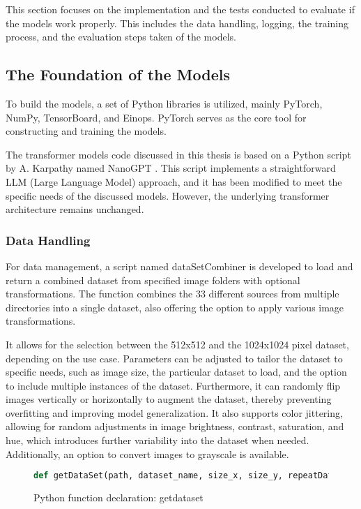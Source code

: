 
    This section focuses on the implementation and the tests conducted to evaluate if the models work properly. This includes the data handling, logging, the training process, and the evaluation steps taken of the models. 


    \subsection{The Foundation of the Models}

    To build the models, a set of Python libraries is utilized, mainly PyTorch, NumPy, TensorBoard, and Einops. PyTorch serves as the core tool for constructing and training the models.
    
    The transformer models code discussed in this thesis is based on a Python script by A. Karpathy named NanoGPT \autocite{nanoGPTkarpathy2023}. This script implements a straightforward LLM (Large Language Model) approach, and it has been modified to meet the specific needs of the discussed models. However, the underlying transformer architecture remains unchanged.
    
    \subsubsection{Data Handling}
    \label{sec:DataHandling}

    For data management, a script named dataSetCombiner is developed to load and return a combined dataset from specified image folders with optional transformations. The function combines the 33 different sources from multiple directories into a single dataset, also offering the option to apply various image transformations.
    
    It allows for the selection between the 512x512 and the 1024x1024 pixel dataset, depending on the use case. Parameters can be adjusted to tailor the dataset to specific needs, such as image size, the particular dataset to load, and the option to include multiple instances of the dataset. Furthermore, it can randomly flip images vertically or horizontally to augment the dataset, thereby preventing overfitting and improving model generalization. It also supports color jittering, allowing for random adjustments in image brightness, contrast, saturation, and hue, which introduces further variability into the dataset when needed. Additionally, an option to convert images to grayscale is available.
    

\begin{figure}[H]
\centering
\begin{lstlisting}[language=Python]
    def getDataSet(path, dataset_name, size_x, size_y, repeatData=1, random_vertical_flip=False, random_horizontal_flip=False, crop_type='random', grayscale=False, color_jitter=False, jitter_brightness=0, jitter_contrast=0, jitter_saturation=0, jitter_hue=0):
\end{lstlisting}
\caption{Python function declaration: getdataset}
\label{fig:getDataSet}
\end{figure}


